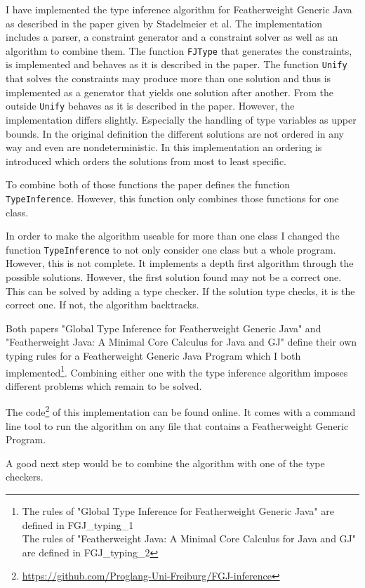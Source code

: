 I have implemented the type inference algorithm for Featherweight Generic Java as described in the paper\cite{FGJ} given by Stadelmeier et al.
The implementation includes a parser, a constraint generator and a constraint solver as well as an algorithm to combine them.
The function \verb|FJType| that generates the constraints, is implemented and behaves as it is described in the paper.
The function \verb|Unify| that solves the constraints may produce more than one solution and thus is implemented as a generator that
yields one solution after another. From the outside \verb|Unify| behaves as it is described in the paper. However, the implementation differs slightly. Especially the handling of type variables as upper bounds. In the original definition the different solutions are not ordered in any way
and even are nondeterministic. In this implementation an ordering is introduced which orders the solutions from most to least specific.

To combine both of those functions the paper defines the function\\\verb|TypeInference|. However, this function only combines those functions
for one class.

In order to make the algorithm useable for more than one class I changed the function \verb|TypeInference| to not only consider one class but a whole
program. However, this is not complete. It implements a depth first algorithm through the possible solutions. However, the first solution found may not be a correct one. This can be solved by adding a type checker. If the solution type checks, it is the correct one. If not, the algorithm backtracks.

Both papers "Global Type Inference for Featherweight Generic Java"\cite{FGJ} and "Featherweight Java: A Minimal Core
Calculus for Java and GJ"\cite{FJ} define their own typing rules for a Featherweight Generic Java Program which I both implemented\footnote{The rules of "Global Type Inference for Featherweight Generic Java" are defined in FGJ\_typing\_1\\The rules of "Featherweight Java: A Minimal Core Calculus for Java and GJ" are defined in FGJ\_typing\_2}.
Combining either one with the type inference algorithm imposes different problems which remain to be solved.

The code\footnote{\url{https://github.com/Proglang-Uni-Freiburg/FGJ-inference}} of this implementation can be found online. It comes with a command line tool to run the algorithm on any file that contains a
Featherweight Generic Program.

A good next step would be to combine the algorithm with one of the type checkers.
